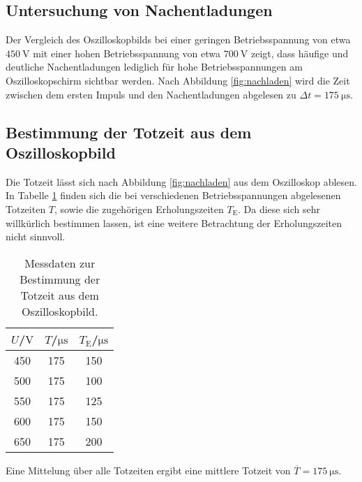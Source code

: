 \subsection{Untersuchung von Nachentladungen}
Der Vergleich des Oszilloskopbilds bei einer geringen Betriebsspannung von etwa $\SI{450}{\volt}$ mit einer hohen Betriebsspannung von etwa $\SI{700}{\volt}$ zeigt, dass häufige und deutliche Nachentladungen lediglich für hohe Betriebsspannungen am Oszilloskopschirm sichtbar werden.
Nach Abbildung \ref{fig:nachladen} wird die Zeit zwischen dem ersten Impuls und den Nachentladungen abgelesen zu $\Delta t=\SI{175}{\micro\second}$.


\subsection{Bestimmung der Totzeit aus dem Oszilloskopbild}
Die Totzeit lässt sich nach Abbildung \ref{fig:nachladen} aus dem Oszilloskop ablesen.
In Tabelle \ref{tab:c} finden sich die bei verschiedenen Betriebsspannungen abgelesenen Totzeiten $T$, sowie die zugehörigen Erholungszeiten $T_\mathrm{E}$.
Da diese sich sehr willkürlich bestimmen lassen, ist eine weitere Betrachtung der Erholungszeiten nicht sinnvoll.
\begin{table}
  \centering
  \caption{Messdaten zur Bestimmung der Totzeit aus dem Oszilloskopbild.}
  \label{tab:c}
\begin{tabular}{ccc}
  \toprule
$U$/$\si{\volt}$ & $T$/$\si{\micro\second}$ & $T_\mathrm{E}$/$\si{\micro\second}$ \\
\midrule
450  & 175  & 150  \\
500  & 175  & 100  \\
550  & 175  & 125  \\
600  & 175  & 150  \\
650  & 175  & 200  \\
\bottomrule
\end{tabular}
\end{table}
Eine Mittelung über alle Totzeiten ergibt eine mittlere Totzeit von $\overline{T}=\SI{175}{\micro\second}$.

